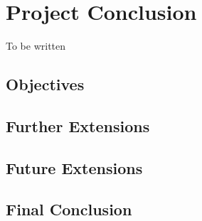 
\chapter{Project Conclusion} %

\label{Chapter7} %


To be written

\section{Objectives}
\section{Further Extensions}
\section{Future Extensions}
\section{Final Conclusion}

